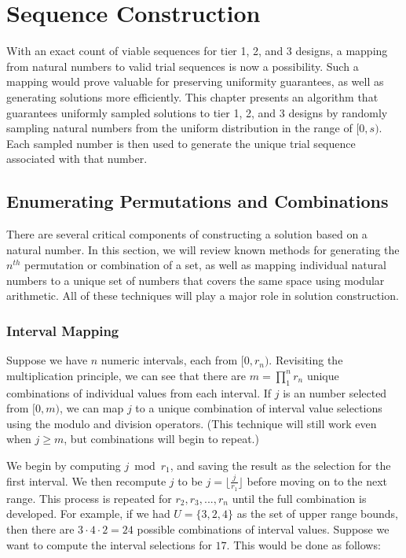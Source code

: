 
\chapter{Sequence Construction}

With an exact count of viable sequences for tier 1, 2, and 3 designs, a mapping from natural numbers to valid trial sequences is now a possibility. Such a mapping would prove valuable for preserving uniformity guarantees, as well as generating solutions more efficiently. This chapter presents an algorithm that guarantees uniformly sampled solutions to tier 1, 2, and 3 designs by randomly sampling natural numbers from the uniform distribution in the range of $[0, s)$. Each sampled number is then used to generate the unique trial sequence associated with that number.


\section{Enumerating Permutations and Combinations}

There are several critical components of constructing a solution based on a natural number. In this section, we will review known methods for generating the $n^{th}$ permutation or combination of a set, as well as mapping individual natural numbers to a unique set of numbers that covers the same space using modular arithmetic. All of these techniques will play a major role in solution construction.

\subsection{Interval Mapping}

Suppose we have $n$ numeric intervals, each from $[0, r_n)$. Revisiting the multiplication principle, we can see that there are $m = \prod_1^n r_n$ unique combinations of individual values from each interval. If $j$ is an number selected from $[0, m)$, we can map $j$ to a unique combination of interval value selections using the modulo and division operators. (This technique will still work even when $j \geq m$, but combinations will begin to repeat.)

We begin by computing $j \bmod r_1$, and saving the result as the selection for the first interval. We then recompute $j$ to be $j = \lfloor \frac{j}{r_1} \rfloor$ before moving on to the next range. This process is repeated for $r_2,r_3,...,r_n$ until the full combination is developed. For example, if we had $U = \{3, 2, 4\}$ as the set of upper range bounds, then there are $3 \cdot 4 \cdot 2 = 24$ possible combinations of interval values. Suppose we want to compute the interval selections for $17$. This would be done as follows:

